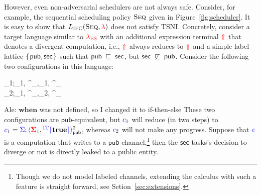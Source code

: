 \documentclass{sigplanconf}
\newcommand{\Varid}[1]{\mathit{#1}}
\def\resethooks{%
  \global\let\SaveRestoreHook\empty
  \global\let\ColumnHook\empty}
\let\hspre\empty
\let\hspost\empty
\newcommand{\Red}[1]{{\color{red} #1}}
\begin{document}
However, even non-adversarial schedulers are not always safe.
Consider, for example, the sequential scheduling policy \ensuremath{\textsc{Seq}} given in
Figure~\ref{fig:scheduler}.
%
It is easy to show that \ensuremath{L_\text{IFC}(\textsc{Seq},\Red{\lambda})} does not satisfy
TSNI.
%
Concretely, consider a target language similar to \ensuremath{\Red{\lambda_{\text{ES}}}} with an
additional expression terminal \ensuremath{\tar{\Uparrow}} that denotes a divergent computation,
i.e., \ensuremath{\tar{\Uparrow}} always reduces to \ensuremath{\tar{\Uparrow}} and a simple label lattice \ensuremath{\{\mskip1.5mu \mathsf{pub},\mathsf{sec}\mskip1.5mu\}} such that \ensuremath{\mathsf{pub}\;\flows{}\;\mathsf{sec}}, but \ensuremath{\mathsf{sec}\;\not\flows{}\;\mathsf{pub}}.
Consider the following two configurations in this language:
\begin{hscode}\SaveRestoreHook
\column{B}{@{}>{\hspre}l<{\hspost}@{}}%
\column{71}{@{}>{\hspre}l<{\hspost}@{}}%
\column{E}{@{}>{\hspre}l<{\hspost}@{}}%
\>[B]{}_{1}\mathrel{=}\ifc{\Sigma};\langle \tar{\Sigma}_{1}, \;\;\;\;\tar{\Uparrow}\;\;\ifc{\rceil}\rangle^{}_{},{}\<[71]%
\>[71]{}\langle \tar{\Sigma}_{1}, \ifc{\Varid{e}}\rangle^{}_{}{}\<[E]%
\\
\>[B]{}_{2}\mathrel{=}\ifc{\Sigma};\langle \tar{\Sigma}_{1}, \;\;\;\;\tar{\Uparrow}\;\;\ifc{\rceil}\rangle^{}_{},{}\<[71]%
\>[71]{}\langle \tar{\Sigma}_{2}, \ifc{\Varid{e}}\rangle^{}_{}{}\<[E]%
\ColumnHook
\end{hscode}\resethooks
\Red{Ale: \ensuremath{\mathbf{when}} was not defined, so I changed it to if-then-else}
These two configurations are \ensuremath{\mathsf{pub}}-equivalent, but \ensuremath{\ifc{c}_{1}} will reduce 
(in two steps) 
to \ensuremath{\ifc{c}_{1}\mathrel{=}\ifc{\Sigma};\langle \tar{\Sigma}_{1}, \ifc{^{\textrm{IT}}\lceil}\mathbf{true}\ifc{\rceil}\rangle^{\mathrm{2}}_{\mathsf{pub}}}, whereas \ensuremath{\ifc{c}_{2}} will not make
any progress.
%
Suppose that \ensuremath{\ifc{\Varid{e}}} is a computation that writes to a \ensuremath{\mathsf{pub}} channel,\footnote{
Though we do not model labeled channels, extending the calculus with such a
feature is straight forward, see Setion~\ref{sec:extensions}.}
then the \ensuremath{\mathsf{sec}} tasks's decision to diverge or not is directly leaked to a
public entity.
\end{document}
